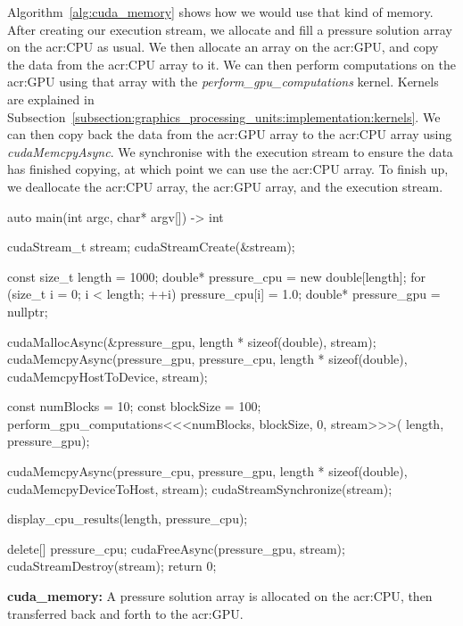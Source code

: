 Algorithm~\ref{alg:cuda_memory} shows how we would use that kind of memory. After creating our
execution stream, we allocate and fill a pressure solution array on the \acrshort{acr:CPU} as usual.
We then allocate an array on the \acrshort{acr:GPU}, and copy the data from the \acrshort{acr:CPU}
array to it. We can then perform computations on the \acrshort{acr:GPU} using that array with the
\textit{perform\_gpu\_computations} kernel. Kernels are explained in
Subsection~\ref{subsection:graphics_processing_units:implementation:kernels}. We can then copy back
the data from the \acrshort{acr:GPU} array to the \acrshort{acr:CPU} array using
\textit{cudaMemcpyAsync}. We synchronise with the execution stream to ensure the data has finished
copying, at which point we can use the \acrshort{acr:CPU} array. To finish up, we deallocate the
\acrshort{acr:CPU} array, the \acrshort{acr:GPU} array, and the execution stream.

\begin{algorithm}[H]
    \begin{cuda}
        auto main(int argc, char* argv[]) -> int {
            cudaStream_t stream;
            cudaStreamCreate(&stream); 

            const size_t length = 1000;
            double* pressure_cpu = new double[length];
            for (size_t i = 0; i < length; ++i){
                pressure_cpu[i] = 1.0;
            }
            double* pressure_gpu = nullptr;

            cudaMallocAsync(&pressure_gpu, length * sizeof(double), stream);
            cudaMemcpyAsync(pressure_gpu, pressure_cpu, length * sizeof(double), 
                cudaMemcpyHostToDevice, stream);

            const numBlocks = 10;
            const blockSize = 100;
            perform_gpu_computations<<<numBlocks, blockSize, 0, stream>>>(
            length, pressure_gpu);
			
            cudaMemcpyAsync(pressure_cpu, pressure_gpu, length * sizeof(double), 
                cudaMemcpyDeviceToHost, stream);
            cudaStreamSynchronize(stream);

            display_cpu_results(length, pressure_cpu);

            delete[] pressure_cpu;
            cudaFreeAsync(pressure_gpu, stream);
            cudaStreamDestroy(stream);
            return 0;
        }\end{cuda}
\caption{\textbf{cuda\_memory:} A pressure solution array is allocated on the \acrshort{acr:CPU}, then transferred back and forth to the \acrshort{acr:GPU}.}\label{alg:cuda_memory}
\end{algorithm}

